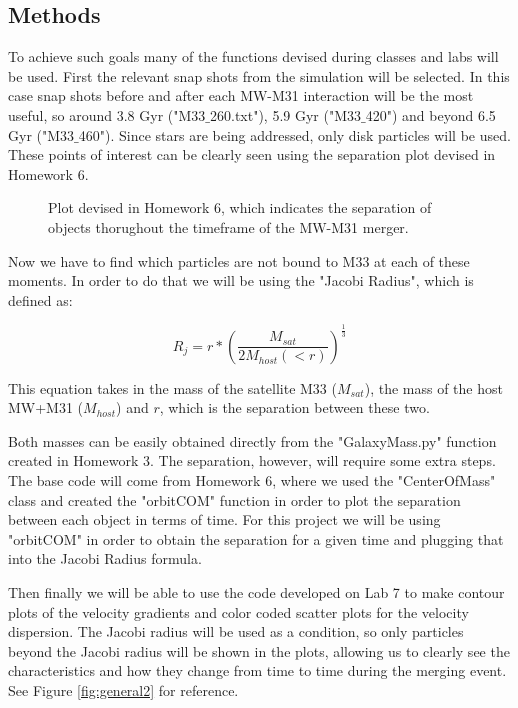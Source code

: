\documentclass[linenumbers,trackchanges]{aastex7}
\begin{document}
\subsection{Methods}

To achieve such goals many of the functions devised during classes and labs will be used. First the relevant snap shots from the simulation will be selected. In this case snap shots before and after each MW-M31 interaction will be the most useful, so around 3.8 Gyr ("M33$\_$260.txt"), 5.9 Gyr ({"M33$\_$420"}) and beyond 6.5 Gyr ("M33$\_$460"). Since stars are being addressed, only disk particles will be used. These points of interest can be clearly seen using the separation plot devised in Homework 6.
\begin{figure*}[h!]
\caption{Plot devised in Homework 6, which indicates the separation of objects thorughout the timeframe of the MW-M31 merger.}
\label{fig:general3}
\end{figure*}

Now we have to find which particles are not bound to M33 at each of these moments. In order to do that we will be using the "Jacobi Radius", which is defined as:

\begin{equation}
    R_j = r*{(\frac{M_{sat}}{2M_{host}(<r)})}^{\frac{1}{3}}
\end{equation}

This equation takes in the mass of the satellite M33 ($M_{sat}$), the mass of the host MW+M31 ($M_{host}$) and $r$, which is the separation between these two.

Both masses can be easily obtained directly from the "GalaxyMass.py" function created in Homework 3. The separation, however, will require some extra steps. The base code will come from Homework 6, where we used the "CenterOfMass" class and created the "orbitCOM" function in order to plot the separation between each object in terms of time. For this project we will be using "orbitCOM" in order to obtain the separation for a given time and plugging that into the Jacobi Radius formula.

Then finally we will be able to use the code developed on Lab 7 to make contour plots of the velocity gradients and color coded scatter plots for the velocity dispersion. The Jacobi radius will be used as a condition, so only particles beyond the Jacobi radius will be shown in the plots, allowing us to clearly see the characteristics and how they change from time to time during the merging event. See Figure \ref{fig:general2} for reference.
\end{document}
